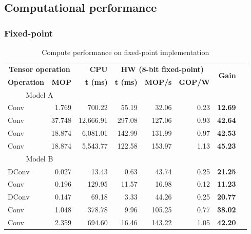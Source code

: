 \subsection{Computational performance}
\subsubsection{Fixed-point}
\begin{table}[!htp]\centering
	\caption{Compute performance on fixed-point implementation}\label{tab:performance_fixed_point }
	\scriptsize
	\begin{tabular}{lrrrrrrr}\toprule
		\multicolumn{2}{c}{\textbf{Tensor operation}} &\textbf{CPU} &\multicolumn{3}{c}{\textbf{HW (8-bit fixed-point)}} &\multirow{2}{*}{\textbf{Gain}} \\\cmidrule{1-6}
		\textbf{Operation} &\textbf{MOP} &\textbf{t (ms)} &\textbf{t (ms)} &\textbf{MOP/s} &\textbf{GOP/W} & \\\midrule
		\multicolumn{2}{c}{Model A} & & & & & \\
		Conv &1.769 &700.22 &55.19 &32.06 &0.23 &\textbf{12.69} \\
		Conv &37.748 &12,666.91 &297.08 &127.06 &0.93 &\textbf{42.64} \\
		Conv &18.874 &6,081.01 &142.99 &131.99 &0.97 &\textbf{42.53} \\
		Conv &18.874 &5,543.77 &122.58 &153.97 &1.13 &\textbf{45.23} \\
		\multicolumn{2}{c}{Model B} & & & & & \\
		DConv &0.027 &13.43 &0.63 &43.74 &0.25 &\textbf{21.25} \\
		Conv &0.196 &129.95 &11.57 &16.98 &0.12 &\textbf{11.23} \\
		DConv &0.147 &69.18 &3.33 &44.26 &0.25 &\textbf{20.77} \\
		Conv &1.048 &378.78 &9.96 &105.25 &0.77 &\textbf{38.02} \\
		Conv &2.359 &694.60 &16.46 &143.22 &1.05 &\textbf{42.20} \\
		\bottomrule
	\end{tabular}
\end{table}



